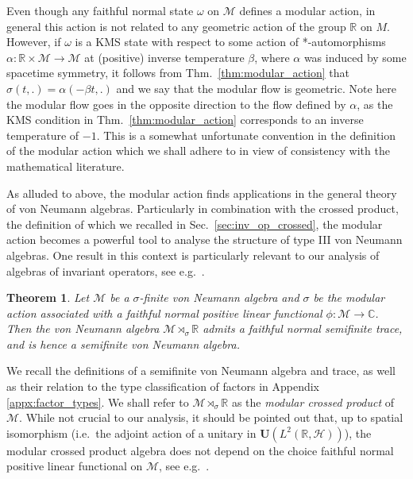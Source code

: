 \documentclass[sn-mathphys-num]{sn-jnl}%
\newcommand{\CC}{\mathbb{C}}
\newcommand{\RR}{\mathbb{R}}
\newcommand{\HH}{\mathcal{H}}
\newcommand{\MM}{\mathcal{M}}
\numberwithin{equation}{section}
\theoremstyle{thmstyleone}%
\newtheorem{theorem}{Theorem}[section]%
\theoremstyle{thmstyletwo}%
\theoremstyle{thmstylethree}%
\begin{document}
Even though any faithful normal state $\omega$ on $\mathcal{M}$ defines a modular action, in general this action is not related to any geometric action of the group $\RR$ on $M$. However, if $\omega$ is a KMS state with respect to some action of *-automorphisms $\alpha:\RR\times \MM\to\MM$ at (positive) inverse temperature $\beta$, where $\alpha$ was induced by some spacetime symmetry, it follows from Thm.\ \ref{thm:modular_action} that $\sigma(t,.)=\alpha(-\beta t,.)$ and we say that the modular flow is geometric. Note here the modular flow goes in the opposite direction to the flow defined by $\alpha$, as the KMS condition in Thm.~\ref{thm:modular_action} corresponds to an inverse temperature of $-1$. This is a somewhat unfortunate convention in the definition of the modular action which we shall adhere to in view of consistency with the mathematical literature.

As alluded to above, the modular action finds applications in the general theory of von Neumann algebras. Particularly in combination with the crossed product, the definition of which we recalled in Sec.\ \ref{sec:inv_op_crossed}, the modular action becomes a powerful tool to analyse the structure of type III von Neumann algebras. One result in this context is particularly relevant to our analysis of algebras of invariant operators, see e.g.~\cite[Ch.~II.3]{vanDaele:1978}.
\begin{theorem}
\label{thm:cross_prod_semifinite}
    Let $\MM$ be a $\sigma$-finite von Neumann algebra and $\sigma$ be the modular action associated with a faithful normal positive linear functional $\phi:\MM\to \CC$. Then the von Neumann algebra $\MM\rtimes_\sigma \RR$ admits a faithful normal semifinite trace, and is hence a semifinite von Neumann algebra.
\end{theorem}
We recall the definitions of a semifinite von Neumann algebra and trace, as well as their relation to the type classification of factors in Appendix \ref{appx:factor_types}. We shall refer to $\MM\rtimes_\sigma \RR$ as the \textit{modular crossed product} of $\MM$. While not crucial to our analysis, it should be pointed out that, up to spatial isomorphism (i.e.\ the adjoint action of a unitary in $\mathbf{U}(L^2(\RR,\HH))$), the modular crossed product algebra does not depend on the choice faithful normal positive linear functional on $\MM$, see e.g.\ \cite[Thm.\ II.2.3]{vanDaele:1978}. 
\end{document}
